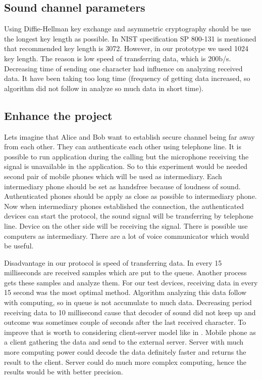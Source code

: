 \documentclass[11pt,titlepage]{article}
\theoremstyle{plain}
\begin{document}
\subsection{Sound channel parameters}

Using Diffie-Hellman key exchange and asymmetric cryptography should be use the longest key length as possible. In NIST specification SP 800-131 is mentioned that recommended key length is 3072. However, in our prototype we used 1024 key length. The reason is low speed of transferring data, which is 200b/s. Decreasing time of sending one character had influence on analyzing received data. It have been taking too long time (frequency of getting data increased, so algorithm did not follow in analyze so much data in short time).

\vspace{5mm}


\subsection{Enhance the project}
Lets imagine that Alice and Bob want to establish secure channel being far away from each other. They can authenticate each other using telephone line. It is possible to run application during the calling but the microphone receiving the signal is unavailable in the application. So to this experiment would be needed second pair of mobile phones which will be used as intermediary. Each intermediary phone should be set as handsfree because of loudness of sound. Authenticated phones should be apply as close as possible to intermediary phone. Now when intermediary phones established the connection, the authenticated devices can start the protocol, the sound signal will be transferring by telephone line. Device on the other side will be receiving the signal. There is possible use computers as intermediary. There are a lot of voice communicator which would be useful.

\vspace{5mm}

Disadvantage in our protocol is speed of transferring data. In every 15 milliseconds are received samples which are put to the queue. Another process gets these samples and analyze them. For our test devices, receiving data in every 15 second was the most optimal method. Algorithm analyzing this data follow with computing, so in queue is not accumulate to much data. Decreasing period receiving data to 10 millisecond cause that decoder of sound did not keep up and outcome was sometimes couple of seconds after the last received character. To improve that is worth to considering client-server model like in \cite{chirp}. Mobile phone as a client gathering the data and send to the external server. Server with much more computing power could decode the data definitely faster and returns the result to the client. Server could do much more complex computing, hence the results would be with better precision.
\end{document}
